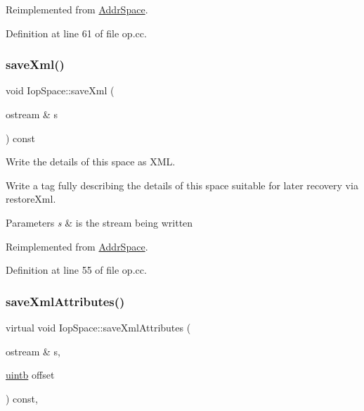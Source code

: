 Reimplemented from \mbox{\hyperlink{class_addr_space_aa2fe50d288eef7ea713cce99774c4eca}{Addr\+Space}}.



Definition at line 61 of file op.\+cc.

\mbox{\label{class_iop_space_a916e2a73cc1dd79b4f5d86ec6c39a9a4}} 
\subsubsection{\texorpdfstring{saveXml()}{saveXml()}}
{\footnotesize\ttfamily void Iop\+Space\+::save\+Xml (\begin{DoxyParamCaption}\item[{ostream \&}]{s }\end{DoxyParamCaption}) const\hspace{0.3cm}{\ttfamily [virtual]}}



Write the details of this space as X\+ML. 

Write a tag fully describing the details of this space suitable for later recovery via restore\+Xml. 
\begin{DoxyParams}{Parameters}
{\em s} & is the stream being written \\
\hline
\end{DoxyParams}


Reimplemented from \mbox{\hyperlink{class_addr_space_ac073a4d446677c54d769abba01318864}{Addr\+Space}}.



Definition at line 55 of file op.\+cc.

\mbox{\label{class_iop_space_a74fe87f16204159a66ea95cc0d9b3355}} 
\subsubsection{\texorpdfstring{saveXmlAttributes()}{saveXmlAttributes()}\hspace{0.1cm}{\footnotesize\ttfamily [1/2]}}
{\footnotesize\ttfamily virtual void Iop\+Space\+::save\+Xml\+Attributes (\begin{DoxyParamCaption}\item[{ostream \&}]{s,  }\item[{\mbox{\hyperlink{types_8h_a2db313c5d32a12b01d26ac9b3bca178f}{uintb}}}]{offset }\end{DoxyParamCaption}) const\hspace{0.3cm}{\ttfamily [inline]}, {\ttfamily [virtual]}}



